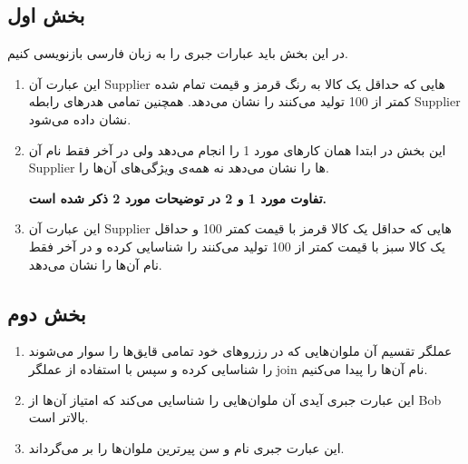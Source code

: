 \subsection*{بخش اول}
در این بخش باید عبارات جبری را به زبان فارسی بازنویسی کنیم.
\begin{enumerate}
	\item 
	این عبارت آن Supplier هایی که حداقل یک کالا به رنگ قرمز و قیمت تمام شده کمتر از 100 تولید می‌کنند را نشان می‌دهد. همچنین تمامی هدرهای رابطه Supplier نشان داده می‌شود.
	
	\item 
	این بخش در ابتدا همان کارهای مورد 1 را انجام می‌دهد ولی در آخر فقط نام آن Supplier ها را نشان می‌دهد نه همه‌ی ویژگی‌های آن‌ها را.
	
	\textbf{تفاوت مورد 1 و 2 در توضیحات مورد 2 ذکر شده است.}
	
	\item 
	این عبارت آن Supplier هایی که حداقل یک کالا قرمز با قیمت کمتر 100 و حداقل یک کالا سبز با قیمت کمتر از 100 تولید می‌کنند را شناسایی کرده و در آخر فقط نام آن‌ها را نشان می‌دهد.

\end{enumerate}
\subsection*{بخش دوم}

\begin{enumerate}
	\item 
	عملگر تقسیم آن ملوان‌هایی که در رزروهای خود تمامی قایق‌ها را سوار می‌شوند را شناسایی کرده و سپس با استفاده از عملگر join نام آن‌ها را پیدا می‌کنیم.
	
	\item 
	این عبارت جبری آیدی آن ملوان‌هایی را شناسایی می‌کند که امتیاز آن‌ها از Bob بالاتر است.                                                    
	\item 
	
	این عبارت جبری نام و سن پیرترین ملوان‌ها را بر می‌گرداند.
\end{enumerate}